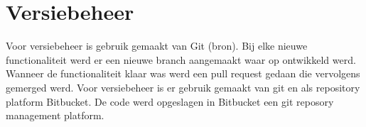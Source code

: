 \section{Versiebeheer}
Voor versiebeheer is gebruik gemaakt van Git (bron).
Bij elke nieuwe functionaliteit werd er een nieuwe branch aangemaakt waar op ontwikkeld werd.
Wanneer de functionaliteit klaar was werd een pull request gedaan die vervolgens gemerged werd.
Voor versiebeheer is er gebruik gemaakt van git en als repository platform Bitbucket.
De code werd opgeslagen in Bitbucket een git reposory management platform.

